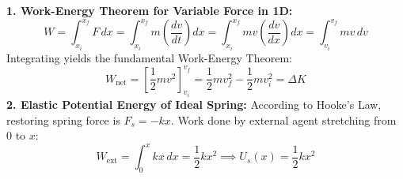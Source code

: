 \documentclass[10pt,twoside,openright]{book}
\begin{document}
\begin{formulabox}
\textbf{1. Work-Energy Theorem for Variable Force in 1D:}
\begin{equation}
  W = \int_{x_i}^{x_f} F\,dx = \int_{x_i}^{x_f} m\left(\frac{dv}{dt}\right)dx = \int_{x_i}^{x_f} m v\left(\frac{dv}{dx}\right)dx = \int_{v_i}^{v_f} m v\,dv
\end{equation}
Integrating yields the fundamental Work-Energy Theorem:
\begin{equation}
  W_{\text{net}} = \left[\frac{1}{2}m v^2\right]_{v_i}^{v_f} = \frac{1}{2}m v_f^2 - \frac{1}{2}m v_i^2 = \Delta K
\end{equation}
\textbf{2. Elastic Potential Energy of Ideal Spring:}
According to Hooke's Law, restoring spring force is $F_s = -kx$. Work done by external agent stretching from $0$ to $x$:
\begin{equation}
  W_{\text{ext}} = \int_{0}^{x} kx\,dx = \frac{1}{2}kx^2 \implies U_s(x) = \frac{1}{2}kx^2
\end{equation}
\end{formulabox}
\end{document}
